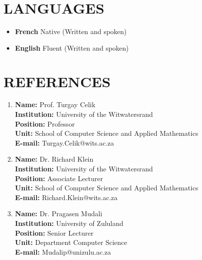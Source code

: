 \documentclass[margin]{res}
\begin{document}
\begin{resume}

\section{LANGUAGES}
\begin{itemize}
\item \textbf{French} Native (Written and spoken)
\item \textbf{English} Fluent (Written and spoken)
\end{itemize}


\section{REFERENCES}
\begin{enumerate}
\item \textbf{Name:} Prof. Turgay Celik\\
\textbf{Institution:} University of the Witwatersrand\\
\textbf{Position:} Professor\\
\textbf{Unit:} School of Computer Science and Applied Mathematics\\
\textbf{E-mail:} Turgay.Celik@wits.ac.za
\\
\item \textbf{Name:} Dr. Richard Klein\\ 
\textbf{Institution:} University of the Witwatersrand\\
\textbf{Position:} Associate Lecturer\\
\textbf{Unit:} School of Computer Science and Applied Mathematics\\
\textbf{E-mail:} Richard.Klein@wits.ac.za
\\
\item \textbf{Name:} Dr. Pragasen Mudali\\ 
\textbf{Institution:} University of Zululand\\
\textbf{Position:} Senior Lecturer\\
\textbf{Unit:} Department Computer Science\\
\textbf{E-mail:} Mudalip@unizulu.ac.za
\end{enumerate}



\end{resume}
\end{document}
